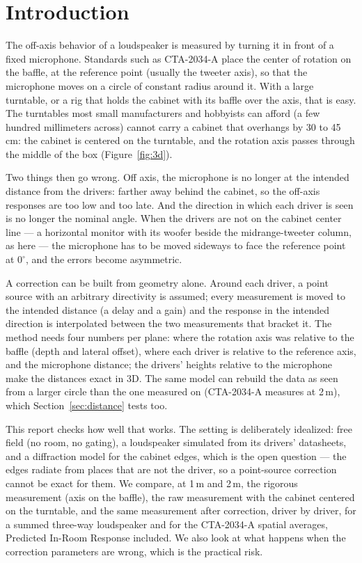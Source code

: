 \documentclass[11pt,a4paper]{article}
\begin{document}
\tableofcontents

\section{Introduction}

The off-axis behavior of a loudspeaker is measured by turning it in front of a fixed
microphone. Standards such as CTA-2034-A place the center of rotation on the baffle, at the
reference point (usually the tweeter axis), so that the microphone moves on a circle of constant
radius around it. With a large turntable, or a rig that holds the cabinet with its baffle over
the axis, that is easy. The turntables most small manufacturers and hobbyists can afford
(a few hundred millimeters across) cannot carry a cabinet that overhangs by 30 to 45\,cm: the
cabinet is centered on the turntable, and the rotation axis passes through the middle of the box
(Figure~\ref{fig:3d}).

Two things then go wrong. Off axis, the microphone is no longer at the intended distance from the
drivers: farther away behind the cabinet, so the off-axis responses are too low and too late.
And the direction in which each driver is seen is no longer the nominal angle. When the drivers
are not on the cabinet center line --- a horizontal monitor with its woofer beside the
midrange-tweeter column, as here --- the microphone has to be moved sideways to face the
reference point at $0^\circ$, and the errors become asymmetric.

A correction can be built from geometry alone. Around each driver, a point source with an
arbitrary directivity is assumed; every measurement is moved to the intended distance (a delay
and a gain) and the response in the intended direction is interpolated between the two
measurements that bracket it. The method needs four numbers per plane: where the rotation axis was
relative to the baffle (depth and lateral offset), where each driver is relative to the reference
axis, and the microphone distance; the drivers' heights relative to the microphone make the distances
exact in 3D. The same model can rebuild the data as seen from a larger circle than the one measured on
(CTA-2034-A measures at 2\,m), which Section~\ref{sec:distance} tests too.

This report checks how well that works. The setting is deliberately idealized: free field
(no room, no gating), a loudspeaker simulated from its drivers' datasheets, and a diffraction
model for the cabinet edges, which is the open question --- the edges radiate from places that
are not the driver, so a point-source correction cannot be exact for them. We compare, at 1\,m
and 2\,m, the rigorous measurement (axis on the baffle), the raw measurement with the cabinet
centered on the turntable, and the same measurement after correction, driver by driver, for a
summed three-way loudspeaker and for the CTA-2034-A spatial averages, Predicted In-Room Response
included. We also look at what happens when the correction parameters are wrong, which is the
practical risk.
\end{document}
